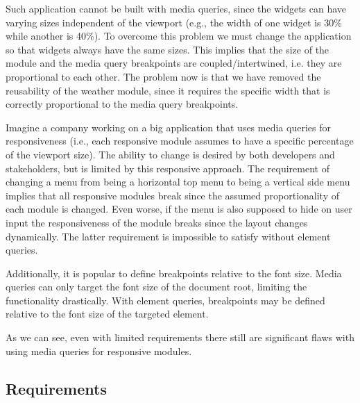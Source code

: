 \documentclass{acm_proc_article-sp}
\begin{document}
    Such application cannot be built with media queries, since the widgets can have varying sizes independent of the viewport (e.g., the width of one widget is 30\% while another is 40\%).
    To overcome this problem we must change the application so that widgets always have the same sizes.
    This implies that the size of the module and the media query breakpoints are coupled/intertwined, i.e. they are proportional to each other.
    The problem now is that we have removed the reusability of the weather module, since it requires the specific width that is correctly proportional to the media query breakpoints. 

    Imagine a company working on a big application that uses media queries for responsiveness (i.e., each responsive module assumes to have a specific percentage of the viewport size).
    The ability to change is desired by both developers and stakeholders, but is limited by this responsive approach.
    The requirement of changing a menu from being a horizontal top menu to being a vertical side menu implies that all responsive modules break since the assumed proportionality of each module is changed.
    Even worse, if the menu is also supposed to hide on user input the responsiveness of the module breaks since the layout changes dynamically.
    The latter requirement is impossible to satisfy without element queries.

    Additionally, it is popular to define breakpoints relative to the font size.
    Media queries can only target the font size of the document root, limiting the functionality drastically.
    With element queries, breakpoints may be defined relative to the font size of the targeted element.

    As we can see, even with limited requirements there still are significant flaws with using media queries for responsive modules.
    
    \subsection{Requirements}\label{sec:reqs}
\end{document}
